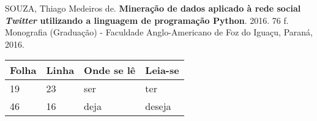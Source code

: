 \begin{errata}
\vspace{\onelineskip}

SOUZA, Thiago Medeiros de. \textbf{Mineração de dados aplicado à rede social \textit{Twitter} utilizando a linguagem de programação Python}. 2016. 76 f. Monografia (Graduação) - Faculdade Anglo-Americano de Foz do Iguaçu, Paraná, 2016.

\begin{table}[htb]
\center
\footnotesize
\begin{tabular}{|p{1.4cm}|p{1cm}|p{3cm}|p{3cm}|}
  \hline
   \textbf{Folha} & \textbf{Linha}  & \textbf{Onde se lê}  & \textbf{Leia-se}  \\
    \hline
    19 & 23 & ser & ter\\
    \hline
    46 & 16 & deja & deseja\\
   \hline
\end{tabular}
\end{table}

\end{errata}